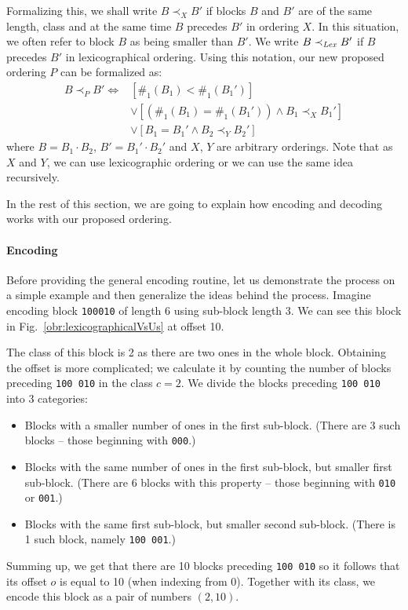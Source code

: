 Formalizing this, we shall write $B\prec_X B'$ if blocks $B$ and $B'$ are of
the same length, class and at the same time $B$ precedes $B'$ in ordering $X$.
In this situation, we often refer to block $B$ as being smaller than $B'$.
We write $B\prec_{\mathit{Lex}} B'$ if $B$ precedes $B'$ in lexicographical ordering.
Using this notation, our new proposed ordering $P$ can be formalized as:
\begin{align*}
    B\prec_P B' \iff
    &[\#_1(B_1) < \#_1(B_1')] \\
    &\lor [(\#_1(B_1) = \#_1(B_1')) \land B_1 \prec_{X} B_1']\\
    &\lor [B_1 = B_1' \land B_2 \prec_{Y} B_2']
\end{align*}
where $B=B_1\cdot B_2$, $B'=B_1'\cdot B_2'$ and $X$, $Y$ are arbitrary orderings.
Note that as $X$ and $Y$, we can use lexicographic ordering or we can use the same
idea recursively.

In the rest of this section, we are going to explain how encoding and decoding works
with our proposed ordering.

\paragraph{Encoding}

Before providing the general encoding routine, let us demonstrate the process on
a simple example and then generalize the ideas behind the process. Imagine encoding
block {\tt 100010} of length 6 using sub-block length 3. We can see this block in
Fig.~\ref{obr:lexicographicalVsUs} at offset 10. 

The class of this block is 2 as there are two ones in the whole block. Obtaining the
offset is more complicated; we calculate it by counting the number of blocks preceding
{\tt 100 010} in the class $c=2$. We divide the blocks preceding {\tt 100 010}
into 3 categories:
\begin{itemize}
    \item Blocks with a smaller number of ones in the first sub-block.
    (There are 3 such blocks -- those beginning with {\tt 000}.)
    \item Blocks with the same number of ones in the first sub-block, but smaller first sub-block.
    (There are 6 blocks with this property -- those beginning with {\tt 010} or {\tt 001}.)
    \item Blocks with the same first sub-block, but smaller second sub-block.
    (There is 1 such block, namely {\tt 100 001}.)
\end{itemize}
Summing up, we get that there are 10 blocks preceding {\tt 100 010} so it follows
that its offset $o$ is equal to 10 (when indexing from 0). Together with its class,
we encode this block as a pair of numbers $(2, 10)$.

